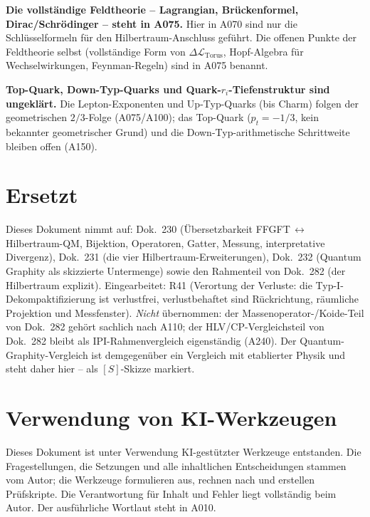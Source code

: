 \textbf{Die vollständige Feldtheorie -- Lagrangian, Brückenformel,
Dirac/Schrödinger -- steht in A075.} Hier in A070 sind nur die Schlüsselformeln
für den Hilbertraum-Anschluss geführt. Die offenen Punkte der Feldtheorie selbst
(vollständige Form von $\Delta\mathcal L_\text{Torus}$, Hopf-Algebra für
Wechselwirkungen, Feynman-Regeln) sind in A075 benannt.

\textbf{Top-Quark, Down-Typ-Quarks und Quark-$r_i$-Tiefenstruktur sind
ungeklärt.} Die Lepton-Exponenten und Up-Typ-Quarks (bis Charm) folgen der
geometrischen $2/3$-Folge (A075/A100); das Top-Quark ($p_t=-1/3$, kein bekannter
geometrischer Grund) und die Down-Typ-arithmetische Schrittweite bleiben offen
(A150).

\section{Ersetzt}

Dieses Dokument nimmt auf: Dok.~230 (Übersetzbarkeit FFGFT\,$\leftrightarrow$\,Hilbertraum-QM,
Bijektion, Operatoren, Gatter, Messung, interpretative Divergenz), Dok.~231 (die
vier Hilbertraum-Erweiterungen), Dok.~232 (Quantum Graphity als skizzierte
Untermenge) sowie den Rahmenteil von Dok.~282 (der Hilbertraum explizit).
Eingearbeitet: R41 (Verortung der Verluste: die Typ-I-Dekompaktifizierung ist
verlustfrei, verlustbehaftet sind Rückrichtung, räumliche Projektion und
Messfenster). \emph{Nicht} übernommen: der Massenoperator-/Koide-Teil von
Dok.~282 gehört sachlich nach A110; der HLV/CP-Vergleichsteil von Dok.~282 bleibt
als IPI-Rahmenvergleich eigenständig (A240). Der Quantum-Graphity-Vergleich ist
demgegenüber ein Vergleich mit etablierter Physik und steht daher hier -- als
$[S]$-Skizze markiert.

\section{Verwendung von KI-Werkzeugen}

Dieses Dokument ist unter Verwendung KI-gestützter Werkzeuge entstanden. Die
Fragestellungen, die Setzungen und alle inhaltlichen Entscheidungen stammen vom
Autor; die Werkzeuge formulieren aus, rechnen nach und erstellen Prüfskripte.
Die Verantwortung für Inhalt und Fehler liegt vollständig beim Autor. Der
ausführliche Wortlaut steht in A010.

